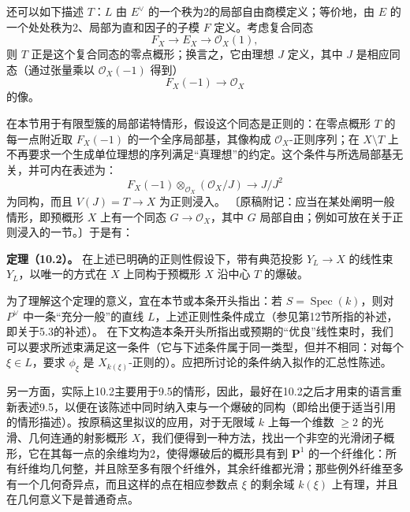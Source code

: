 还可以如下描述 $T$：$L$ 由 $E^\vee$ 的一个秩为2的局部自由商模定义；等价地，由 $E$ 的一个处处秩为2、局部为直和因子的子模 $F$ 定义。考虑复合同态
\[
F_X\longrightarrow E_X\longrightarrow\mathcal O_X(1),
\]
则 $T$ 正是这个复合同态的零点概形；换言之，它由理想 $J$ 定义，其中 $J$ 是相应同态（通过张量乘以 $\mathcal O_X(-1)$ 得到）
\[
F_X(-1)\longrightarrow\mathcal O_X
\]
的像。

在本节用于有限型簇的局部诺特情形，假设这个同态是正则的：在零点概形 $T$ 的每一点附近取 $F_X(-1)$ 的一个全序局部基，其像构成 $\mathcal O_X$-正则序列；在 $X\setminus T$ 上不再要求一个生成单位理想的序列满足“真理想”的约定。这个条件与所选局部基无关，并可内在表述为：
\[
F_X(-1)\otimes_{\mathcal O_X}(\mathcal O_X/J)
\longrightarrow J/J^2
\]
为同构，而且 $V(J)=T\to X$ 为正则浸入。
〔原稿附记：应当在某处阐明一般情形，即预概形 $X$ 上有一个同态 $G\to\mathcal O_X$，其中 $G$ 局部自由；例如可放在关于正则浸入的一节。〕于是有：

\par\noindent\textbf{定理（10.2）。}
在上述已明确的正则性假设下，带有典范投影 $Y_L\to X$ 的线性束 $Y_L$，以唯一的方式在 $X$ 上同构于预概形 $X$ 沿中心 $T$ 的爆破。

为了理解这个定理的意义，宜在本节或本条开头指出：若 $S=\operatorname{Spec}(k)$，则对 $P^\vee$ 中一条“充分一般”的直线 $L$，上述正则性条件成立（参见第12节所指的补述，即关于5.3的补述）。
在下文构造本条开头所指出或预期的“优良”线性束时，我们可以要求所述束满足这一条件（它与下述条件属于同一类型，但并不相同：对每个 $\xi\in L$，要求 $\phi_\xi$ 是 $X_{k(\xi)}$-正则的）。应把所讨论的条件纳入拟作的汇总性陈述。

另一方面，实际上10.2主要用于9.5的情形，因此，最好在10.2之后才用束的语言重新表述9.5，以便在该陈述中同时纳入束与一个爆破的同构（即给出便于适当引用的情形描述）。按原稿这里拟议的应用，对于无限域 $k$ 上每一个维数 $\ge2$ 的光滑、几何连通的射影概形 $X$，我们便得到一种方法，找出一个非空的光滑闭子概形，它在其每一点的余维均为2，使得爆破后的概形具有到 $\mathbf P^1$ 的一个纤维化：所有纤维均几何整，并且除至多有限个纤维外，其余纤维都光滑；那些例外纤维至多有一个几何奇异点，而且这样的点在相应参数点 $\xi$ 的剩余域 $k(\xi)$ 上有理，并且在几何意义下是普通奇点。

